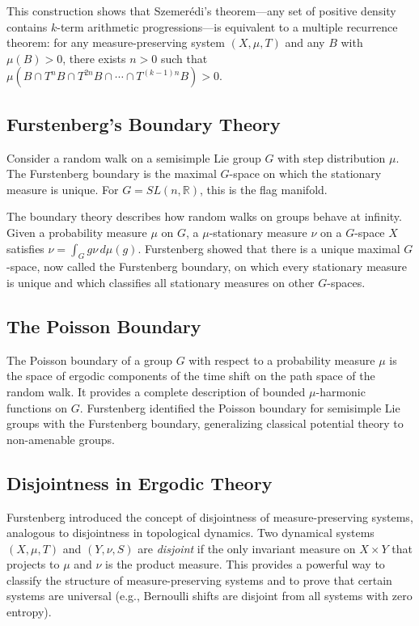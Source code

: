 This construction shows that Szemer\'edi's theorem---any set of positive density contains $k$-term arithmetic progressions---is equivalent to a multiple recurrence theorem: for any measure-preserving system $(X,\mu,T)$ and any $B$ with $\mu(B) > 0$, there exists $n > 0$ such that $\mu(B \cap T^n B \cap T^{2n} B \cap \cdots \cap T^{(k-1)n} B) > 0$.

\subsection{Furstenberg's Boundary Theory}

Consider a random walk on a semisimple Lie group $G$ with step distribution $\mu$. The Furstenberg boundary is the maximal $G$-space on which the stationary measure is unique. For $G = SL(n,\mathbb{R})$, this is the flag manifold.

The boundary theory describes how random walks on groups behave at infinity. Given a probability measure $\mu$ on $G$, a $\mu$-stationary measure $\nu$ on a $G$-space $X$ satisfies $\nu = \int_G g\nu \, d\mu(g)$. Furstenberg showed that there is a unique maximal $G$-space, now called the Furstenberg boundary, on which every stationary measure is unique and which classifies all stationary measures on other $G$-spaces.

\subsection{The Poisson Boundary}

The Poisson boundary of a group $G$ with respect to a probability measure $\mu$ is the space of ergodic components of the time shift on the path space of the random walk. It provides a complete description of bounded $\mu$-harmonic functions on $G$. Furstenberg identified the Poisson boundary for semisimple Lie groups with the Furstenberg boundary, generalizing classical potential theory to non-amenable groups.

\subsection{Disjointness in Ergodic Theory}

Furstenberg introduced the concept of disjointness of measure-preserving systems, analogous to disjointness in topological dynamics. Two dynamical systems $(X,\mu,T)$ and $(Y,\nu,S)$ are \emph{disjoint} if the only invariant measure on $X \times Y$ that projects to $\mu$ and $\nu$ is the product measure. This provides a powerful way to classify the structure of measure-preserving systems and to prove that certain systems are universal (e.g., Bernoulli shifts are disjoint from all systems with zero entropy).

